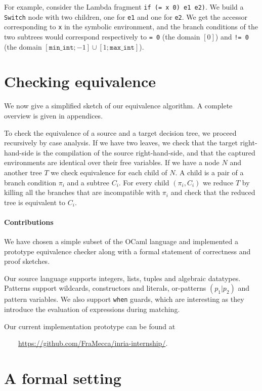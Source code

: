\documentclass[12pt]{article}
\begin{document}
For example, consider the Lambda fragment
%
\lstinline{if (= x 0) e1 e2)}.
%
We build a \lstinline{Switch} node with two children, one for
\lstinline{e1} and one for \lstinline{e2}. We get the accessor
corresponding to \lstinline{x} in the symbolic environment, and the
branch conditions of the two subtrees would correspond respectively to
\lstinline{= 0} (the domain $[0]$) and \lstinline{!= 0} (the domain
$[\mathtt{min\_int}; -1] \cup [1; \mathtt{max\_int}]$).

\section{Checking equivalence}

We now give a simplified sketch of our equivalence
algorithm. A complete overview is given in appendices.

To check the equivalence of a source and a target decision tree,
we proceed recursively by case analysis.
%
If we have two leaves, we check that the target right-hand-side is the
compilation of the source right-hand-side, and that the captured
environments are identical over their free variables.
%
If we have a node $N$ and another tree $T$ we check equivalence for
each child of $N$. A child is a pair of a branch condition $\pi_i$ and a
subtree $C_i$. For every child $(\pi_i, C_i)$ we reduce $T$ by killing all
the branches that are incompatible with $\pi_i$ and check that the
reduced tree is equivalent to $C_i$.

\paragraph{Contributions} We have chosen a simple subset of the OCaml
language and implemented a prototype equivalence checker along with
a formal statement of correctness and proof sketches.

Our source language supports integers, lists, tuples and algebraic
datatypes. Patterns support wildcards, constructors and literals,
or-patterns $(p_1 | p_2)$ and pattern variables.  We also support
\texttt{when} guards, which are interesting as they introduce the
evaluation of expressions during matching.

Our current implementation prototype can be found at

$\qquad$\url{https://github.com/FraMecca/inria-internship/}.

\newpage
\appendix

\section{A formal setting}
\end{document}
